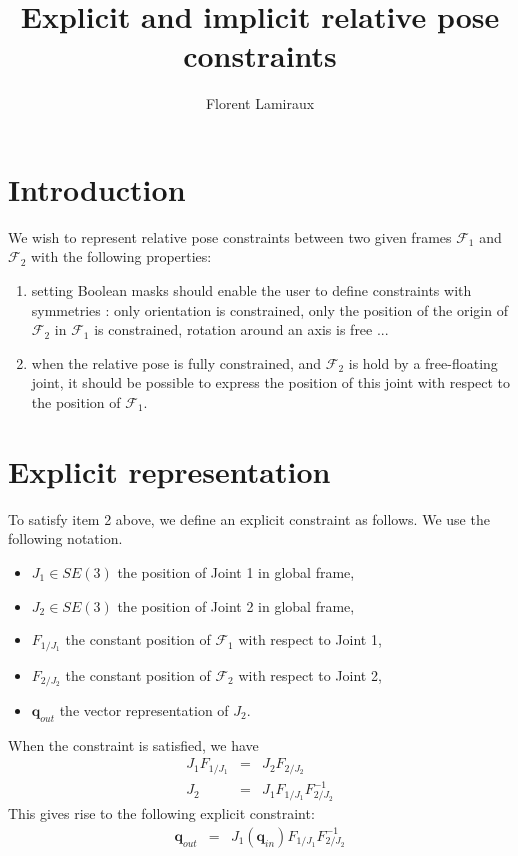 \documentclass {article}
\title {Explicit and implicit relative pose constraints}
\author {Florent Lamiraux}
\date {}
\newcommand\conf{\mathbf{q}}
\newcommand\fr{\mathcal{F}}
\begin{document}
\maketitle

\section {Introduction}

We wish to represent relative pose constraints between two given frames $\fr_1$ and $\fr_2$ with the following properties:
\begin{enumerate}
\item setting Boolean masks should enable the user to define constraints with
  symmetries : only orientation is constrained, only the position of the origin of $\fr_2$ in $\fr_1$ is constrained, rotation around an axis is free ...
\item when the relative pose is fully constrained, and $\fr_2$ is hold by a free-floating joint, it should be possible to express the position of this joint with respect to the position of $\fr_1$.
\end{enumerate}

\section {Explicit representation}

To satisfy item 2 above, we define an explicit constraint as follows. We use the following notation.
\begin {itemize}
\item $J_1\in SE(3)$ the position of Joint 1 in global frame,
\item $J_2\in SE(3)$ the position of Joint 2 in global frame,
\item $F_{1/J_1}$ the constant position of $\fr_1$ with respect to Joint 1,
\item $F_{2/J_2}$ the constant position of $\fr_2$ with respect to Joint 2,
\item $\conf_{out}$ the vector representation of $J_2$.
\end {itemize}
When the constraint is satisfied, we have
\begin {eqnarray*}
  J_1 F_{1/J_1} &=& J_2 F_{2/J_2} \\
  J_2 &=& J_1 F_{1/J_1} F_{2/J_2}^{-1}
\end {eqnarray*}
This gives rise to the following explicit constraint:
\begin {eqnarray*}
  \conf_{out} &=& {J_1} (\conf_{in}) F_{1/J_1} F_{2/J_2}^{-1}
\end {eqnarray*}
\end{document}
